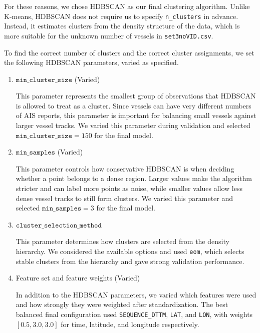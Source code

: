 \documentclass[12pt]{fphw}
\begin{document}
For these reasons, we chose HDBSCAN as our final clustering algorithm. Unlike K-means, HDBSCAN does not require us to specify \texttt{n\_clusters} in advance. Instead, it estimates clusters from the density structure of the data, which is more suitable for the unknown number of vessels in \texttt{set3noVID.csv}.

To find the correct number of clusters and the correct cluster assignments, we set the following HDBSCAN parameters, varied as specified.

\begin{enumerate}
    \item $\texttt{min\_cluster\_size}$ (Varied)
    
    This parameter represents the smallest group of observations that HDBSCAN is allowed to treat as a cluster. Since vessels can have very different numbers of AIS reports, this parameter is important for balancing small vessels against larger vessel tracks. We varied this parameter during validation and selected $\texttt{min\_cluster\_size}=150$ for the final model.

    \item $\texttt{min\_samples}$ (Varied)
    
    This parameter controls how conservative HDBSCAN is when deciding whether a point belongs to a dense region. Larger values make the algorithm stricter and can label more points as noise, while smaller values allow less dense vessel tracks to still form clusters. We varied this parameter and selected $\texttt{min\_samples}=3$ for the final model.

    \item $\texttt{cluster\_selection\_method}$
    
    This parameter determines how clusters are selected from the density hierarchy. We considered the available options and used \texttt{eom}, which selects stable clusters from the hierarchy and gave strong validation performance.

    \item Feature set and feature weights (Varied)
    
    In addition to the HDBSCAN parameters, we varied which features were used and how strongly they were weighted after standardization. The best balanced final configuration used \texttt{SEQUENCE\_DTTM}, \texttt{LAT}, and \texttt{LON}, with weights $[0.5, 3.0, 3.0]$ for time, latitude, and longitude respectively.
\end{enumerate}
\end{document}
